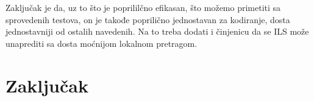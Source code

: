 \documentclass[a4paper]{article}
\begin{document}
Zaključak je da, uz to što je poprililčno efikasan, što možemo primetiti sa sprovedenih testova, on je takođe poprilično jednostavan za kodiranje, dosta jednostavniji od ostalih navedenih. Na to treba dodati i činjenicu da se ILS može unaprediti sa dosta moćnijom lokalnom pretragom.








\section{Zaključak}
\label{sec:zakljucak}
\end{document}
